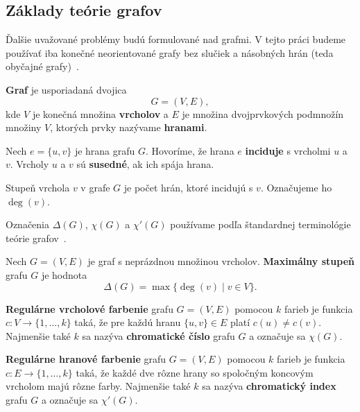 \subsection{Základy teórie grafov}\label{sec:combinatorics:graph-theory}
Ďalšie uvažované problémy budú formulované nad grafmi. V tejto práci budeme používať iba konečné neorientované grafy bez slučiek a násobných hrán (teda obyčajné grafy)~\cite{kollar-polakovic2025dim}.

\begin{definition}
    \textbf{Graf} je usporiadaná dvojica
    \[
        G = (V,E),
    \]
    kde $V$ je konečná množina \textbf{vrcholov} a $E$ je množina dvojprvkových podmnožín množiny $V$, ktorých prvky nazývame \textbf{hranami}.
\end{definition}

\begin{definition}
    Nech $e=\{u,v\}$ je hrana grafu $G$. Hovoríme, že hrana $e$ \textbf{inciduje} s vrcholmi $u$ a $v$. Vrcholy $u$ a $v$ sú \textbf{susedné}, ak ich spája hrana.
\end{definition}

\begin{definition}
    Stupeň vrchola $v$ v grafe $G$ je počet hrán, ktoré incidujú s $v$.
    Označujeme ho $\deg(v)$.
\end{definition}

Označenia $\Delta(G)$, $\chi(G)$ a $\chi'(G)$ používame podľa štandardnej terminológie teórie grafov~\cite{diestel2005graph}.

\begin{definition}
    Nech $G=(V,E)$ je graf s neprázdnou množinou vrcholov. \textbf{Maximálny stupeň} grafu $G$ je hodnota
    \[
        \Delta(G)=\max\{\deg(v)\mid v \in V\}.
    \]
\end{definition}

\begin{definition}
    \textbf{Regulárne vrcholové farbenie} grafu $G=(V,E)$ pomocou $k$ farieb je funkcia
    $c:V \to \{1,\dots,k\}$ taká, že pre každú hranu $\{u,v\}\in E$ platí $c(u)\neq c(v)$.
    Najmenšie také $k$ sa nazýva \textbf{chromatické číslo} grafu $G$ a označuje sa $\chi(G)$.
\end{definition}

\begin{definition}
    \textbf{Regulárne hranové farbenie} grafu $G=(V,E)$ pomocou $k$ farieb je funkcia
    $c:E \to \{1,\dots,k\}$ taká, že každé dve rôzne hrany so spoločným koncovým vrcholom majú rôzne farby.
    Najmenšie také $k$ sa nazýva \textbf{chromatický index} grafu $G$ a označuje sa $\chi'(G)$.
\end{definition}

